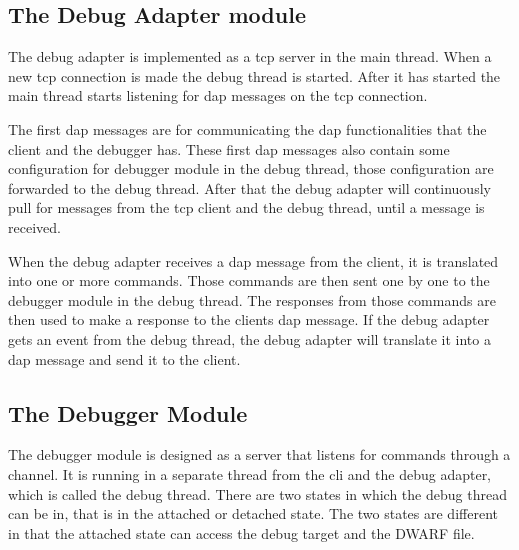 \subsection{The Debug Adapter module}


The debug adapter is implemented as a \gls{tcp} server in the main thread.
When a new \gls{tcp} connection is made the debug thread is started.
After it has started the main thread starts listening for \gls{dap} messages on the \gls{tcp} connection.


The first \gls{dap} messages are for communicating the \gls{dap} functionalities that the client and the debugger has.
These first \gls{dap} messages also contain some configuration for debugger module in the debug thread, those configuration are forwarded to the debug thread.
After that the debug adapter will continuously pull for messages from the \gls{tcp} client and the debug thread, until a message is received.


When the debug adapter receives a \gls{dap} message from the client, it is translated into one or more commands.
Those commands are then sent one by one to the debugger module in the debug thread.
The responses from those commands are then used to make a response to the clients \gls{dap} message.
If the debug adapter gets an event from the debug thread, the debug adapter will translate it into a \gls{dap} message and send it to the client.








\subsection{The Debugger Module}
The debugger module is designed as a server that listens for commands through a channel.
It is running in a separate thread from the \acrshort{cli} and the debug adapter, which is called the debug thread.
There are two states in which the debug thread can be in, that is in the attached or detached state.
The two states are different in that the attached state can access the debug target and the \gls{DWARF} file.


